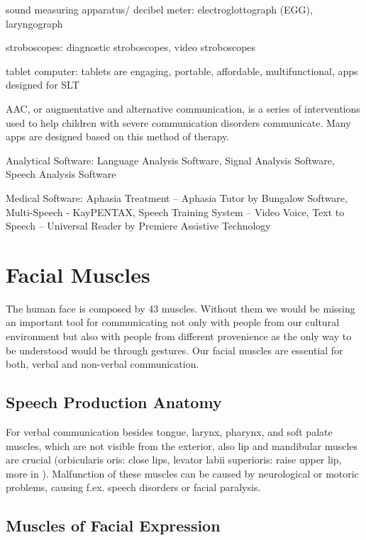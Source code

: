 sound measuring apparatus/ decibel meter: electroglottograph (EGG), laryngograph

stroboscopes: diagnostic stroboscopes, video stroboscopes

tablet computer: tablets are engaging, portable, affordable, multifunctional, apps designed for SLT

AAC, or augmentative and alternative communication, is a series of interventions used to help children with severe communication disorders communicate. Many apps are designed based on this method of therapy.

Analytical Software:
Language Analysis Software,
Signal Analysis Software,
Speech Analysis Software

Medical Software:
Aphasia Treatment – Aphasia Tutor by Bungalow Software,
Multi-Speech - KayPENTAX,
Speech Training System – Video Voice,
Text to Speech – Universal Reader by Premiere Assistive Technology



\section{Facial Muscles} %
\label{sec:anatomy}


The human face is composed by 43 muscles. Without them we would be missing an important tool for communicating not only with people from our cultural environment but also with people from different provenience as the only way to be understood would be through gestures. Our facial muscles are essential for both, verbal and non-verbal communication.\par 

\subsection{Speech Production Anatomy}
For verbal communication besides tongue, larynx, pharynx, and soft palate muscles, which are not visible from the exterior, also lip and mandibular muscles are crucial (orbicularis oris: close lips, levator labii superioris: raise upper lip, more in \cite{PhonManual}). 
Malfunction of these muscles can be caused by neurological or motoric problems, causing f.ex. speech disorders or facial paralysis. 

\subsection{Muscles of Facial Expression}

